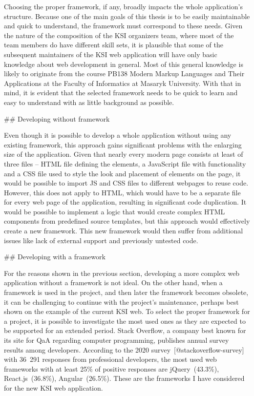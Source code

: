 \documentclass[
  digital, %
  oneside, %
  lof,     %
  nolot,     %
]{fithesis4}
\begin{document}
Choosing the proper framework, if any, broadly impacts the whole application's structure. Because one of the main goals of this thesis is to be easily maintainable and quick to understand, the framework must correspond to these needs. Given the nature of the composition of the \acrshort{KSI} organizers team, where most of the team members do have different skill sets, it is plausible that some of the subsequent maintainers of the \acrshort{KSI} web application will have only basic knowledge about web development in general. Most of this general knowledge is likely to originate from the course PB138 Modern Markup Languages and Their Applications at the Faculty of Informatics at Masaryk University. With that in mind, it is evident that the selected framework needs to be quick to learn and easy to understand with as little background as possible.

## Developing without framework

Even though it is possible to develop a whole application without using any existing framework, this approach gains significant problems with the enlarging size of the application. Given that nearly every modern page consists at least of three files -- \acrshort{HTML} file defining the elements, a JavaScript file with functionality and a \acrshort{CSS} file used to style the look and placement of elements on the page, it would be possible to import JS and \acrshort{CSS} files to different webpages to reuse code. However, this does not apply to \acrshort{HTML}, which would have to be a separate file for every web page of the application, resulting in significant code duplication. It would be possible to implement a logic that would create complex \acrshort{HTML} components from predefined source templates, but this approach would effectively create a new framework. This new framework would then suffer from additional issues like lack of external support and previously untested code.

## Developing with a framework

For the reasons shown in the previous section, developing a more complex web application without a framework is not ideal. On the other hand, when a framework is used in the project, and then later the framework becomes obsolete, it can be challenging to continue with the project's maintenance, perhaps best shown on the example of the current \acrshort{KSI} web. To select the proper framework for a project, it is possible to investigate the most used ones as they are expected to be supported for an extended period. Stack Overflow, a company best known for its site for \acrshort{QaA} regarding computer programming, publishes annual survey results among developers. According to the 2020 survey~[@stackoverflow-survey] with 36~291 responses from professional developers, the most used web frameworks with at least 25\% of positive responses are jQuery~(43.3\%), React.js~(36.8\%), Angular~(26.5\%). These are the frameworks I have considered for the new \acrshort{KSI} web application.
\end{document}
